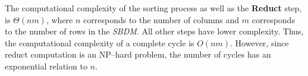 \documentclass[authoryear,preprint,review,12pt]{elsarticle}
\begin{document}
	The computational complexity of the sorting process as well as the \textbf{Reduct} step, is $\Theta (nm)$, where $n$ corresponds to the number of columns and $m$ corresponds to the number of rows in the \textit{SBDM}. All other steps have lower complexity. Thus, the computational complexity of a complete cycle is $O (nm)$. However, since reduct computation is an NP--hard problem, the number of cycles has an exponential relation to $n$.
	
\end{document}
